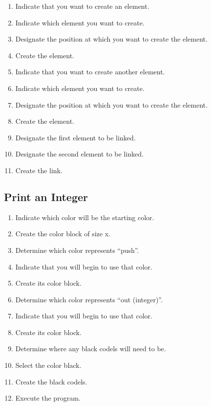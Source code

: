 \begin{enumerate}
  \item Indicate that you want to create an element.
  \item Indicate which element you want to create.
  \item Designate the position at which you want to create the element.
  \item Create the element.
  \item Indicate that you want to create another element.
  \item Indicate which element you want to create.
  \item Designate the position at which you want to create the element.
  \item Create the element.
  \item Designate the first element to be linked.
  \item Designate the second element to be linked.
  \item Create the link.
\end{enumerate}

\subsection{Print an Integer}
\label{app:euc_print_integer}

\begin{enumerate}
  \item Indicate which color will be the starting color.
  \item Create the color block of size x.
  \item Determine which color represents ``push''.
  \item Indicate that you will begin to use that color.
  \item Create its color block.
  \item Determine which color represents ``out (integer)''.
  \item Indicate that you will begin to use that color.
  \item Create its color block.
  \item Determine where any black codels will need to be.
  \item Select the color black.
  \item Create the black codels.
  \item Execute the program.
\end{enumerate}

